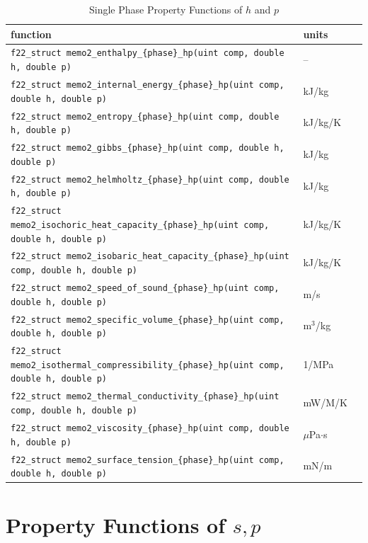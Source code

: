 \documentclass[oneside]{book}
\begin{document}
\begin{table}[h!]
\centering
\caption{Single Phase Property Functions of $h$ and $p$}
\begin{tabular}{ l l l }
\hline
function & units \\
\hline
\hline
\texttt{f22\_struct memo2\_enthalpy\_\{phase\}\_hp(uint comp, double h, double p)} & -- \\ [1ex]
\texttt{f22\_struct memo2\_internal\_energy\_\{phase\}\_hp(uint comp, double h, double p)} &  kJ/kg \\ [1ex]
\texttt{f22\_struct memo2\_entropy\_\{phase\}\_hp(uint comp, double h, double p)} &  kJ/kg/K \\ [1ex]
\texttt{f22\_struct memo2\_gibbs\_\{phase\}\_hp(uint comp, double h, double p)} &  kJ/kg \\ [1ex]
\texttt{f22\_struct memo2\_helmholtz\_\{phase\}\_hp(uint comp, double h, double p)} &  kJ/kg \\ [1ex]
\texttt{f22\_struct memo2\_isochoric\_heat\_capacity\_\{phase\}\_hp(uint comp, double h, double p)} &  kJ/kg/K \\ [1ex]
\texttt{f22\_struct memo2\_isobaric\_heat\_capacity\_\{phase\}\_hp(uint comp, double h, double p)} &  kJ/kg/K \\ [1ex]
\texttt{f22\_struct memo2\_speed\_of\_sound\_\{phase\}\_hp(uint comp, double h, double p)} &  m/s \\ [1ex]
\texttt{f22\_struct memo2\_specific\_volume\_\{phase\}\_hp(uint comp, double h, double p)} &  m$^3$/kg \\ [1ex]
\texttt{f22\_struct memo2\_isothermal\_compressibility\_\{phase\}\_hp(uint comp, double h, double p)} &  1/MPa \\ [1ex]
\texttt{f22\_struct memo2\_thermal\_conductivity\_\{phase\}\_hp(uint comp, double h, double p)} &  mW/M/K \\ [1ex]
\texttt{f22\_struct memo2\_viscosity\_\{phase\}\_hp(uint comp, double h, double p)} &  $\mu$Pa$\cdot$s \\ [1ex]
\texttt{f22\_struct memo2\_surface\_tension\_\{phase\}\_hp(uint comp, double h, double p)} &  mN/m \\ [1ex]
 \hline    
\end{tabular}
\label{table:single_hp_props}
\end{table}

\section{Property Functions of $s, p$}
\end{document}

